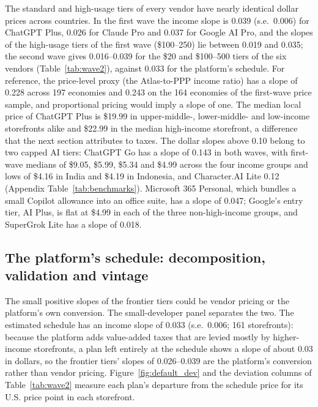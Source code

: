 \documentclass[11pt]{article}
\theoremstyle{definition}
\theoremstyle{remark}
\begin{document}
The standard and high-usage tiers of every vendor have nearly identical dollar prices across countries. In the first wave the income slope is 0.039 (s.e.\ 0.006) for ChatGPT Plus, 0.026 for Claude Pro and 0.037 for Google AI Pro, and the slopes of the high-usage tiers of the first wave (\$100--250) lie between 0.019 and 0.035; the second wave gives 0.016--0.039 for the \$20 and \$100--500 tiers of the six vendors (Table~\ref{tab:wave2}), against 0.033 for the platform's schedule. For reference, the price-level proxy (the Atlas-to-PPP income ratio) has a slope of 0.228 across 197 economies and 0.243 on the 164 economies of the first-wave price sample, and proportional pricing would imply a slope of one. The median local price of ChatGPT Plus is \$19.99 in upper-middle-, lower-middle- and low-income storefronts alike and \$22.99 in the median high-income storefront, a difference that the next section attributes to taxes. The dollar slopes above 0.10 belong to two capped AI tiers: ChatGPT Go has a slope of 0.143 in both waves, with first-wave medians of \$9.05, \$5.99, \$5.34 and \$4.99 across the four income groups and lows of \$4.16 in India and \$4.19 in Indonesia, and Character.AI Lite 0.12 (Appendix Table~\ref{tab:benchmarks}). Microsoft 365 Personal, which bundles a small Copilot allowance into an office suite, has a slope of 0.047; Google's entry tier, AI Plus, is flat at \$4.99 in each of the three non-high-income groups, and SuperGrok Lite has a slope of 0.018.

\subsection{The platform's schedule: decomposition, validation and vintage}\label{sec:decomp}

The small positive slopes of the frontier tiers could be vendor pricing or the platform's own conversion. The small-developer panel separates the two. The estimated schedule has an income slope of 0.033 (s.e.\ 0.006; 161 storefronts): because the platform adds value-added taxes that are levied mostly by higher-income storefronts, a plan left entirely at the schedule shows a slope of about 0.03 in dollars, so the frontier tiers' slopes of 0.026--0.039 are the platform's conversion rather than vendor pricing. Figure~\ref{fig:default_dev} and the deviation columns of Table~\ref{tab:wave2} measure each plan's departure from the schedule price for its U.S. price point in each storefront.
\end{document}
